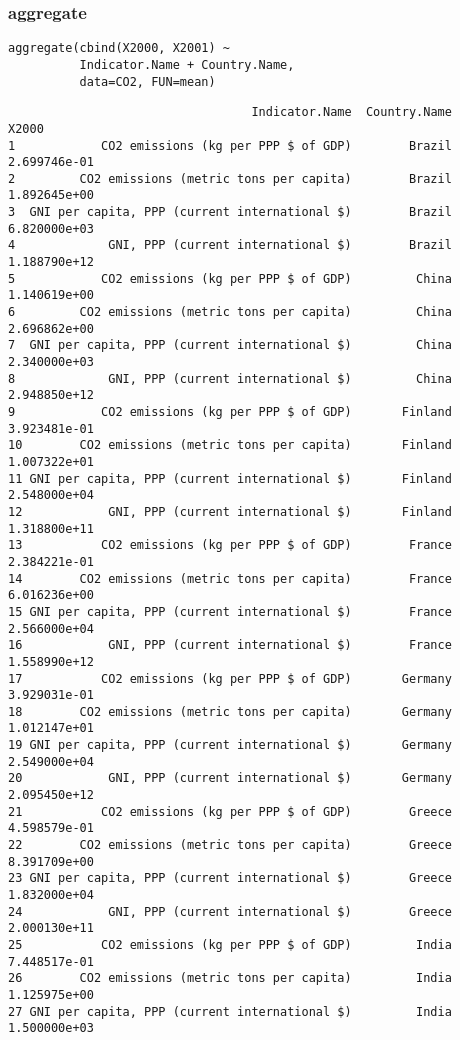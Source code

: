 \documentclass[xcolor={usenames,svgnames,dvipsnames}]{beamer}
\begin{document}
\begin{frame}[fragile]
\frametitle{aggregate}
\label{sec-3-7}


\lstset{language=R}
\begin{lstlisting}
aggregate(cbind(X2000, X2001) ~
          Indicator.Name + Country.Name,
          data=CO2, FUN=mean)
\end{lstlisting}


\begin{verbatim}
                                  Indicator.Name  Country.Name        X2000
1            CO2 emissions (kg per PPP $ of GDP)        Brazil 2.699746e-01
2         CO2 emissions (metric tons per capita)        Brazil 1.892645e+00
3  GNI per capita, PPP (current international $)        Brazil 6.820000e+03
4             GNI, PPP (current international $)        Brazil 1.188790e+12
5            CO2 emissions (kg per PPP $ of GDP)         China 1.140619e+00
6         CO2 emissions (metric tons per capita)         China 2.696862e+00
7  GNI per capita, PPP (current international $)         China 2.340000e+03
8             GNI, PPP (current international $)         China 2.948850e+12
9            CO2 emissions (kg per PPP $ of GDP)       Finland 3.923481e-01
10        CO2 emissions (metric tons per capita)       Finland 1.007322e+01
11 GNI per capita, PPP (current international $)       Finland 2.548000e+04
12            GNI, PPP (current international $)       Finland 1.318800e+11
13           CO2 emissions (kg per PPP $ of GDP)        France 2.384221e-01
14        CO2 emissions (metric tons per capita)        France 6.016236e+00
15 GNI per capita, PPP (current international $)        France 2.566000e+04
16            GNI, PPP (current international $)        France 1.558990e+12
17           CO2 emissions (kg per PPP $ of GDP)       Germany 3.929031e-01
18        CO2 emissions (metric tons per capita)       Germany 1.012147e+01
19 GNI per capita, PPP (current international $)       Germany 2.549000e+04
20            GNI, PPP (current international $)       Germany 2.095450e+12
21           CO2 emissions (kg per PPP $ of GDP)        Greece 4.598579e-01
22        CO2 emissions (metric tons per capita)        Greece 8.391709e+00
23 GNI per capita, PPP (current international $)        Greece 1.832000e+04
24            GNI, PPP (current international $)        Greece 2.000130e+11
25           CO2 emissions (kg per PPP $ of GDP)         India 7.448517e-01
26        CO2 emissions (metric tons per capita)         India 1.125975e+00
27 GNI per capita, PPP (current international $)         India 1.500000e+03

\end{verbatim}
\end{frame}
\end{document}
